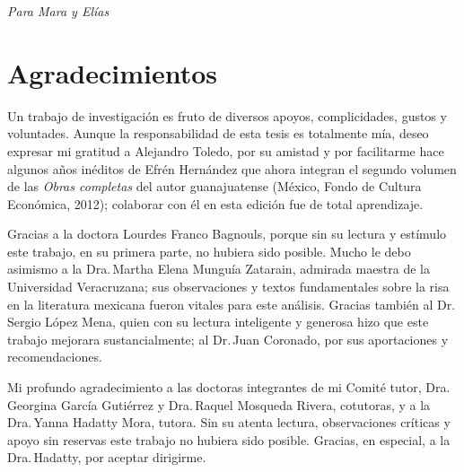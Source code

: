 \documentclass[14pt,twoside,final]{extbook} %
\begin{document}
\setcounter{page}{1}
\parindent=5mm %
\parskip=0mm %
\newcommand{\nota}[1]{\marginpar{\color{blue}\tiny #1}} %
\newpage
\pagestyle{empty}

\newpage
\pagestyle{empty}
\null\vfill
\newpage
\pagestyle{empty}
\vspace*{42pt}
\begin{flushright}
\textit{Para Mara y Elías} 
\end{flushright}
\newpage
\pagestyle{empty}
\chapter*{Agradecimientos}\label{ch:agradecimientos}
\thispagestyle{empty}
\pagestyle{fancy}
\fancyhf{} %
\fancyhead[LE,RO]{\textlf{\thepage}}
\renewcommand{\headrulewidth}{0pt}
\setcounter{page}{5}
Un trabajo de investigación es fruto de diversos apoyos, complicidades, gustos y voluntades. Aunque la responsabilidad de esta tesis es totalmente mía, deseo expresar mi gratitud a Alejandro Toledo, por su amistad y por facilitarme hace algunos años inéditos de Efrén Hernández que ahora integran el segundo volumen de las \emph{Obras completas} del autor guanajuatense (México, Fondo de Cultura Económica, 2012); colaborar con él en esta edición fue de total aprendizaje.

Gracias a la doctora Lourdes Franco Bagnouls, porque sin su lectura y estímulo este trabajo, en su primera parte, no hubiera sido posible. Mucho le debo asimismo a la Dra.\,Martha Elena Munguía Zatarain, admirada maestra de la Universidad Veracruzana; sus observaciones y textos fundamentales sobre la risa en la literatura mexicana fueron vitales para este análisis. Gracias también al Dr.\,Sergio López Mena, quien con su lectura inteligente y generosa hizo que este trabajo mejorara sustancialmente; al Dr.\,Juan Coronado, por sus aportaciones y recomendaciones.

Mi profundo agradecimiento a las doctoras integrantes de mi Comité tutor, Dra.\,Georgina García Gutiérrez y Dra.\,Raquel Mosqueda Rivera, cotutoras, y a la Dra.\,Yanna Hadatty Mora, tutora. Sin su atenta lectura, observaciones críticas y apoyo sin reservas este trabajo no hubiera sido posible. Gracias, en especial, a la Dra.\,Hadatty, por aceptar dirigirme.
\end{document}
